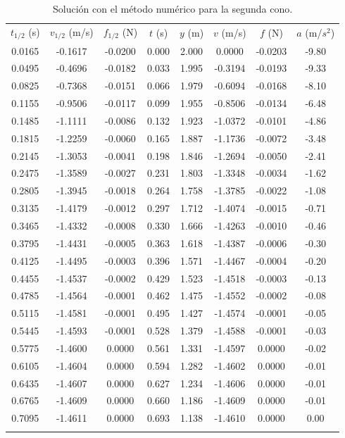     \clearpage
\begin{longtable}{|c|c|c|c|c|c|c|c|}
    \hline
    \rowcolor{azulito}\multicolumn{8}{|c|}{Cono 2} \\
    \hline
    \rowcolor{azulito} $t_{1/2}$ (s) & $v_{1/2}$ (m/s) & $f_{1/2} $ (N)& $t$ (s)& $y$ (m)& $v$ (m/s)& $f$ (N)& $a$ (m/$s^2$)\\
    \endhead
    \hline 0.0165 & -0.1617 & -0.0200 & 0.000 & 2.000 & 0.0000 & -0.0203 & -9.80 \\
    \hline 0.0495 & -0.4696 & -0.0182 & 0.033 & 1.995 & -0.3194 & -0.0193 & -9.33 \\
    \hline 0.0825 & -0.7368 & -0.0151 & 0.066 & 1.979 & -0.6094 & -0.0168 & -8.10 \\
    \hline 0.1155 & -0.9506 & -0.0117 & 0.099 & 1.955 & -0.8506 & -0.0134 & -6.48 \\
    \hline 0.1485 & -1.1111 & -0.0086 & 0.132 & 1.923 & -1.0372 & -0.0101 & -4.86 \\
    \hline 0.1815 & -1.2259 & -0.0060 & 0.165 & 1.887 & -1.1736 & -0.0072 & -3.48 \\
    \hline 0.2145 & -1.3053 & -0.0041 & 0.198 & 1.846 & -1.2694 & -0.0050 & -2.41 \\
    \hline 0.2475 & -1.3589 & -0.0027 & 0.231 & 1.803 & -1.3348 & -0.0034 & -1.62 \\
    \hline 0.2805 & -1.3945 & -0.0018 & 0.264 & 1.758 & -1.3785 & -0.0022 & -1.08 \\
    \hline 0.3135 & -1.4179 & -0.0012 & 0.297 & 1.712 & -1.4074 & -0.0015 & -0.71 \\
    \hline 0.3465 & -1.4332 & -0.0008 & 0.330 & 1.666 & -1.4263 & -0.0010 & -0.46 \\
    \hline 0.3795 & -1.4431 & -0.0005 & 0.363 & 1.618 & -1.4387 & -0.0006 & -0.30 \\
    \hline 0.4125 & -1.4495 & -0.0003 & 0.396 & 1.571 & -1.4467 & -0.0004 & -0.20 \\
    \hline 0.4455 & -1.4537 & -0.0002 & 0.429 & 1.523 & -1.4518 & -0.0003 & -0.13 \\
    \hline 0.4785 & -1.4564 & -0.0001 & 0.462 & 1.475 & -1.4552 & -0.0002 & -0.08 \\
    \hline 0.5115 & -1.4581 & -0.0001 & 0.495 & 1.427 & -1.4574 & -0.0001 & -0.05 \\
    \hline 0.5445 & -1.4593 & -0.0001 & 0.528 & 1.379 & -1.4588 & -0.0001 & -0.03 \\
    \hline 0.5775 & -1.4600 & 0.0000 & 0.561 & 1.331 & -1.4597 & 0.0000 & -0.02 \\
    \hline 0.6105 & -1.4604 & 0.0000 & 0.594 & 1.282 & -1.4602 & 0.0000 & -0.01 \\
    \hline 0.6435 & -1.4607 & 0.0000 & 0.627 & 1.234 & -1.4606 & 0.0000 & -0.01 \\
    \hline 0.6765 & -1.4609 & 0.0000 & 0.660 & 1.186 & -1.4609 & 0.0000 & -0.01 \\
    \hline 0.7095 & -1.4611 & 0.0000 & 0.693 & 1.138 & -1.4610 & 0.0000 & 0.00 \\
    \hline
    \caption{Solución con el método numérico
    para la segunda cono.}
    \label{tab:Cono2Euler}
\end{longtable}
